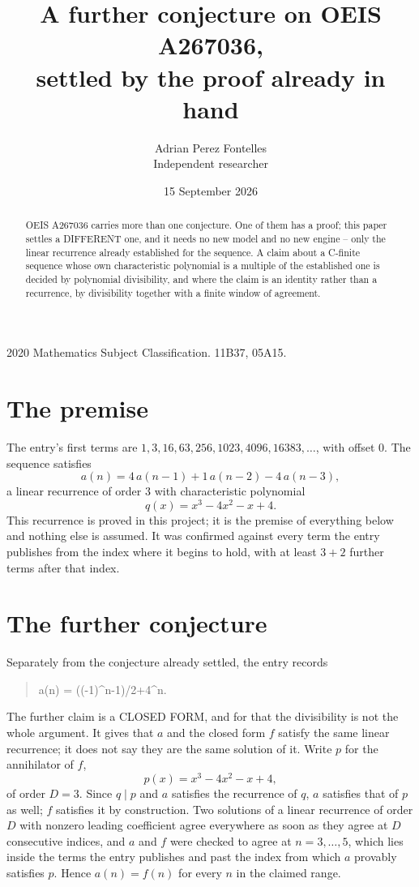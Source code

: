 \documentclass[11pt,a4paper]{article}
\title{A further conjecture on OEIS A267036,\\ \large settled by the proof already in hand}
\author{Adrian Perez Fontelles\\ \small Independent researcher}
\date{15 September 2026}
\theoremstyle{plain}
\theoremstyle{definition}
\begin{document}
\maketitle

\begin{abstract}
OEIS A267036 carries more than one conjecture. One of them has a proof; this paper settles a
DIFFERENT one, and it needs no new model and no new engine -- only the linear recurrence already
established for the sequence. A claim about a C-finite sequence whose own characteristic
polynomial is a multiple of the established one is decided by polynomial divisibility, and where
the claim is an identity rather than a recurrence, by divisibility together with a finite window
of agreement.
\end{abstract}

\noindent\small 2020 Mathematics Subject Classification. 11B37, 05A15.\normalsize

\section{The premise}

The entry's first terms are $1, 3, 16, 63, 256, 1023, 4096, 16383,\dots$, with offset $0$. The sequence satisfies
\[
  a(n)=4\,a(n-1) + 1\,a(n-2) - 4\,a(n-3) ,
\]
a linear recurrence of order $3$ with characteristic polynomial
\[
  q(x)=x^{3} - 4 x^{2} - x + 4 .
\]
This recurrence is proved in this project; it is the premise of everything below and nothing else is assumed.
It was confirmed against every term the entry publishes from the index where it begins to hold,
with at least $3+2$ further terms after that index.

\section{The further conjecture}

Separately from the conjecture already settled, the entry records

\begin{quote}\raggedright a(n) = ((-1)\^{}n-1)/2+4\^{}n.\end{quote}

The further claim is a CLOSED FORM, and for that the divisibility is not the whole argument. It
gives that $a$ and the closed form $f$ satisfy the same linear recurrence; it does not say they
are the same solution of it. Write $p$ for the annihilator of $f$,
\[
  p(x)=x^{3} - 4 x^{2} - x + 4 ,
\]
of order $D=3$. Since $q\mid p$ and $a$ satisfies the recurrence of $q$, $a$ satisfies that of
$p$ as well; $f$ satisfies it by construction. Two solutions of a linear recurrence of order $D$
with nonzero leading coefficient agree everywhere as soon as they agree at $D$ consecutive
indices, and $a$ and $f$ were checked to agree at $n=3,\dots,5$,
which lies inside the terms the entry publishes and past the index from which $a$ provably
satisfies $p$. Hence $a(n)=f(n)$ for every $n$ in the claimed range.
\end{document}
